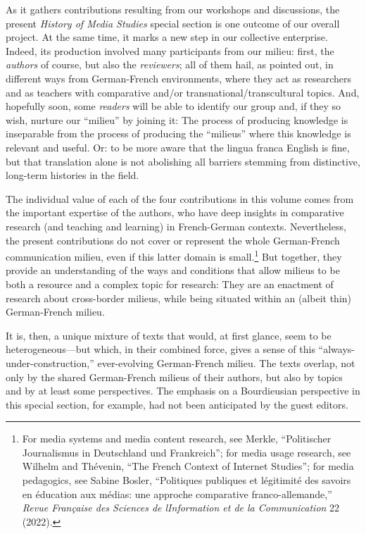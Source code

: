 \documentclass{tufte-handout}
\begin{document}
As it gathers contributions resulting from our workshops and
discussions, the present \emph{History of Media Studies} special section
is one outcome of our overall project. At the same time, it marks a new
step in our collective enterprise. Indeed, its production involved many
participants from our milieu: first, the \emph{authors} of course, but
also the \emph{reviewers}; all of them hail, as pointed out, in
different ways from German-French environments, where they act as
researchers and as teachers with comparative and/or
transnational/transcultural topics. And, hopefully soon, some
\emph{readers} will be able to identify our group and, if they so wish,
nurture our ``milieu'' by joining it: The process of producing knowledge
is inseparable from the process of producing the ``milieus'' where this
knowledge is relevant and useful. Or: to be more aware that the lingua
franca English is fine, but that translation alone is not abolishing all
barriers stemming from distinctive, long-term histories in the field.

The individual value of each of the four contributions in this volume
comes from the important expertise of the authors, who have deep
insights in comparative research (and teaching and learning) in
French-German contexts. Nevertheless, the present contributions do not
cover or represent the whole German-French communication milieu, even if
this latter domain is small.\footnote{For media systems and media
  content research, see Merkle, ``Politischer Journalismus in
  Deutschland und Frankreich''; for media usage research, see Wilhelm
  and Thévenin, ``The French Context of Internet Studies''; for media
  pedagogics, see Sabine Bosler, ``Politiques publiques et légitimité
  des savoirs en éducation aux médias: une approche comparative
  franco-allemande,'' \emph{Revue Française des Sciences de
  l\textquotesingle Information et de la Communication} 22 (2022).} But
together, they provide an understanding of the ways and conditions that
allow milieus to be both a resource and a complex topic for research:
They are an enactment of research about cross-border milieus, while
being situated within an (albeit thin) German-French milieu.

It is, then, a unique mixture of texts that would, at first glance, seem
to be heterogeneous---but which, in their combined force, gives a sense
of this ``always-under-construction,'' ever-evolving German-French
milieu. The texts overlap, not only by the shared German-French milieus
of their authors, but also by topics and by at least some perspectives.
The emphasis on a Bourdieusian perspective in this special section, for
example, had not been anticipated by the guest editors.
\end{document}
